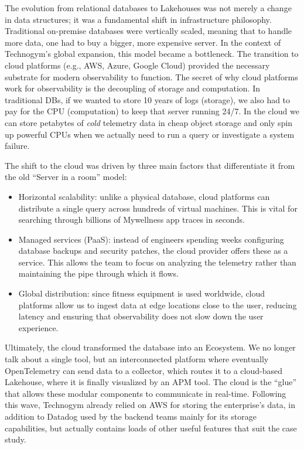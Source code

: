 \documentclass[12pt,a4paper,openright,twoside]{book}
\begin{document}
The evolution from relational databases to Lakehouses was not merely a change in data structures; it was a fundamental shift in infrastructure philosophy. Traditional on-premise databases were vertically scaled, meaning that to handle more data, one had to buy a bigger, more expensive server. In the context of Technogym’s global expansion, this model became a bottleneck. The transition to cloud platforms (e.g., AWS, Azure, Google Cloud) provided the necessary substrate for modern observability to function. The secret of why cloud platforms work for observability is the decoupling of storage and computation. In traditional DBs, if we wanted to store 10 years of logs (storage), we also had to pay for the CPU (computation) to keep that server running 24/7. In the cloud we can store petabytes of \textit{cold} telemetry data in cheap object storage and only spin up powerful CPUs when we actually need to run a query or investigate a system failure.

The shift to the cloud was driven by three main factors that differentiate it from the old ``Server in a room'' model:
\begin{itemize}
    \item Horizontal scalability: unlike a physical database, cloud platforms can distribute a single query across hundreds of virtual machines. This is vital for searching through billions of Mywellness app traces in seconds.
    \item Managed services (\ac{PaaS}): instead of engineers spending weeks configuring database backups and security patches, the cloud provider offers these as a service. This allows the team to focus on analyzing the telemetry rather than maintaining the pipe through which it flows.
    \item Global distribution: since fitness equipment is used worldwide, cloud platforms allow us to ingest data at edge locations close to the user, reducing latency and ensuring that observability does not slow down the user experience.
\end{itemize}

Ultimately, the cloud transformed the database into an Ecosystem. We no longer talk about a single tool, but an interconnected platform where eventually OpenTelemetry can send data to a collector, which routes it to a cloud-based Lakehouse, where it is finally visualized by an APM tool. The cloud is the ``glue'' that allows these modular components to communicate in real-time. Following this wave, Technogym already relied on AWS for storing the enterprise's data, in addition to Datadog used by the backend teams mainly for its storage capabilities, but actually contains loads of other useful features that suit the case study. 
\end{document}
